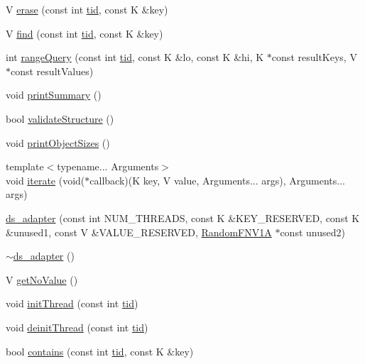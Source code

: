 \begin{DoxyCompactItemize}
\item 
V \hyperlink{classds__adapter_a1bf459e8449df93cc738a644aeffdcfb}{erase} (const int \hyperlink{microbench_2main_8cpp_a9ca9869868fe7e7a38a921cc7de4103f}{tid}, const K \&key)
\item 
V \hyperlink{classds__adapter_a0109b0d011810f687c9e9273eb1d1bc8}{find} (const int \hyperlink{microbench_2main_8cpp_a9ca9869868fe7e7a38a921cc7de4103f}{tid}, const K \&key)
\item 
int \hyperlink{classds__adapter_a23a9c8db5425e98a93d647df1c6c23dd}{range\+Query} (const int \hyperlink{microbench_2main_8cpp_a9ca9869868fe7e7a38a921cc7de4103f}{tid}, const K \&lo, const K \&hi, K $\ast$const result\+Keys, V $\ast$const result\+Values)
\item 
void \hyperlink{classds__adapter_aac97293215557665d2ef1e1a0d06fcfd}{print\+Summary} ()
\item 
bool \hyperlink{classds__adapter_ae50fe8a8683c0278cdd4c45e1405860d}{validate\+Structure} ()
\item 
void \hyperlink{classds__adapter_a33b13b7059a8c0345fb59a324dc3a691}{print\+Object\+Sizes} ()
\item 
{\footnotesize template$<$typename... Arguments$>$ }\\void \hyperlink{classds__adapter_ab1e0bb9a9b403ba68e85bf53219b1368}{iterate} (void($\ast$callback)(K key, V value, Arguments... args), Arguments... args)
\item 
\hyperlink{classds__adapter_a8bd2274b39a6716d649cde5a8f313b40}{ds\+\_\+adapter} (const int N\+U\+M\+\_\+\+T\+H\+R\+E\+A\+DS, const K \&K\+E\+Y\+\_\+\+R\+E\+S\+E\+R\+V\+ED, const K \&unused1, const V \&V\+A\+L\+U\+E\+\_\+\+R\+E\+S\+E\+R\+V\+ED, \hyperlink{classRandomFNV1A}{Random\+F\+N\+V1A} $\ast$const unused2)
\item 
\hyperlink{classds__adapter_a366f46dd39d59f2d4a147589f5fd98e3}{$\sim$ds\+\_\+adapter} ()
\item 
V \hyperlink{classds__adapter_a9e1e4aec136b351d1a6820d70484a6c5}{get\+No\+Value} ()
\item 
void \hyperlink{classds__adapter_a3733f6a6b57312b1b5e4fb5181d82a0b}{init\+Thread} (const int \hyperlink{microbench_2main_8cpp_a9ca9869868fe7e7a38a921cc7de4103f}{tid})
\item 
void \hyperlink{classds__adapter_a173ca48b19fc1dc346159ea582c690cd}{deinit\+Thread} (const int \hyperlink{microbench_2main_8cpp_a9ca9869868fe7e7a38a921cc7de4103f}{tid})
\item 
bool \hyperlink{classds__adapter_aecf1899dbe9fae93c72ee2b5549cf6eb}{contains} (const int \hyperlink{microbench_2main_8cpp_a9ca9869868fe7e7a38a921cc7de4103f}{tid}, const K \&key)

\end{DoxyCompactItemize}
